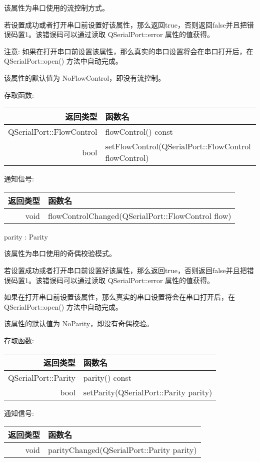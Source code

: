 该属性为串口使用的流控制方式。

若设置成功或者打开串口前设置好该属性，那么返回true，否则返回false并且把错误码置1。该错误码可以通过读取 QSerialPort::error 属性的值获得。

注意: 如果在打开串口前设置该属性，那么真实的串口设置将会在串口打开后，在 QSerialPort::open() 方法中自动完成。

该属性的默认值为 NoFlowControl，即没有流控制。

存取函数:

\begin{tabular}{|r|l|}
	\hline
返回类型 &	函数名 \\ 
\hline
QSerialPort::FlowControl &	flowControl() const \\ 
\hline
bool &	setFlowControl(QSerialPort::FlowControl flowControl) \\ 
\hline
\end{tabular}


通知信号:

\begin{tabular}{|r|l|}
\hline
返回类型 &函数名 \\ 
\hline
void 	&flowControlChanged(QSerialPort::FlowControl flow) \\ 
\hline
\end{tabular}

parity : Parity 

该属性为串口使用的奇偶校验模式。

若设置成功或者打开串口前设置好该属性，那么返回true，否则返回false并且把错误码置1。该错误码可以通过读取 QSerialPort::error 属性的值获得。

\begin{notice}
如果在打开串口前设置该属性，那么真实的串口设置将会在串口打开后，在 QSerialPort::open() 方法中自动完成。
\end{notice}

该属性的默认值为 NoParity，即没有奇偶校验。

存取函数:

\begin{tabular}{|r|l|}
\hline
返回类型 &函数名 \\ 
\hline
QSerialPort::Parity &	parity() const \\
\hline
bool &	setParity(QSerialPort::Parity parity) \\ 
\hline
\end{tabular}

通知信号:

\begin{tabular}{|r|l|}
	\hline
	返回类型 &函数名 \\ 
	\hline
	void 	& parityChanged(QSerialPort::Parity parity) \\
\hline
\end{tabular}



